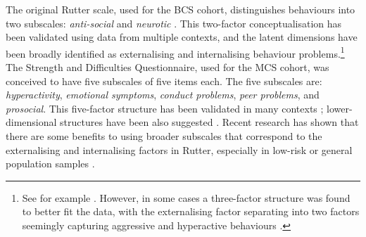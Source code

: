 The original Rutter scale, used for the BCS cohort, distinguishes behaviours into two subscales: \emph{anti-social} and \emph{neurotic} \citep{Rutter1970}. This two-factor conceptualisation has been validated using data from multiple contexts, and the latent dimensions have been broadly identified as externalising and internalising behaviour problems.\footnote{See for example \cite{Fowler1979,Venables1983,Tremblay1987,Berglund1999,Klein2009}. However, in some cases a three-factor structure was found to better fit the data, with the externalising factor separating into two factors seemingly capturing aggressive and hyperactive behaviours \citep{Behar1974,McGee1985}.} The Strength and Difficulties Questionnaire, used for the MCS cohort, was conceived to have five subscales of five items each. The five subscales are: \emph{hyperactivity}, \emph{emotional symptoms}, \emph{conduct problems}, \emph{peer problems}, and \emph{prosocial}. This five-factor structure has been validated in many contexts \citep{Stone2010}; lower-dimensional structures have been also suggested \citep{Dickey2004}. Recent research has shown that there are some benefits to using broader subscales that correspond to the externalising and internalising factors in Rutter, especially in low-risk or general population samples \citep{Goodman2010}.

